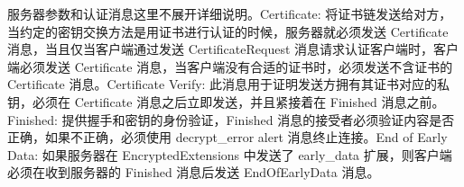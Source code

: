   服务器参数和认证消息这里不展开详细说明。Certificate: 将证书链发送给对方，当约定的密钥交换方法是用证书进行认证的时候，服务器就必须发送 Certificate 消息，当且仅当客户端通过发送 CertificateRequest 消息请求认证客户端时，客户端必须发送 Certificate 消息，当客户端没有合适的证书时，必须发送不含证书的 Certificate 消息。Certificate Verify: 此消息用于证明发送方拥有其证书对应的私钥，必须在 Certificate 消息之后立即发送，并且紧接着在 Finished 消息之前。Finished: 提供握手和密钥的身份验证，Finished 消息的接受者必须验证内容是否正确，如果不正确，必须使用 decrypt\_error alert 消息终止连接。End of Early Data: 如果服务器在 EncryptedExtensions 中发送了 early\_data 扩展，则客户端必须在收到服务器的 Finished 消息后发送 EndOfEarlyData 消息。